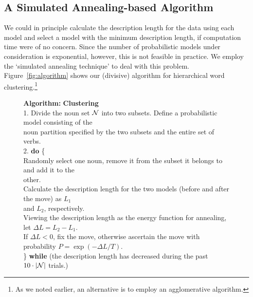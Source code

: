 \subsection{A Simulated Annealing-based Algorithm}
We could in principle calculate the description length for the data
using each model and select a model with the minimum description
length, if computation time were of no concern. Since the number of
probabilistic models under consideration is exponential, however, this
is not feasible in practice. We employ the `simulated annealing
technique' to deal with this problem. Figure~\ref{fig:algorithm} shows
our (divisive) algorithm for hierarchical word clustering.\footnote{As
  we noted earlier, an alternative is to employ an agglomerative
  algorithm.}
\begin{figure*}[htb]
\begin{center}
\begin{tabbing}
{\bf Algorithm:} {\bf Clustering} \\

1. Divide the noun set ${\cal N}$ into two subsets. Define a
probabilistic model consisting of the \\ 

noun partition specified by the two subsets and the entire set of verbs. \\ 

2. {\bf do} \{ \\

 Randomly select one noun, remove it from the subset it
belongs to and add it to the \\

\tab other. \\ 

 Calculate the description length for the two models (before
 and after the move) as $L_1$ \\ 

\tab and $L_2$, respectively. \\

 Viewing the description length as the energy function for
 annealing, let $\Delta L=L_2 -L_1$.\\ 

 \tab If $\Delta L < 0$, fix the move, otherwise ascertain the
 move with probability $P =\exp(-\Delta L / T )$. \\ 

 \} {\bf while} (the description length has decreased during the
 past $10 \cdot |{\cal N}|$ trials.) \\ 


\end{tabbing}
\end{center}
\end{figure*}
